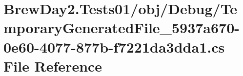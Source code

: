 \hypertarget{_brew_day2_8_tests01_2obj_2_debug_2_temporary_generated_file__5937a670-0e60-4077-877b-f7221da3dda1_8cs}{}\section{Brew\+Day2.\+Tests01/obj/\+Debug/\+Temporary\+Generated\+File\+\_\+5937a670-\/0e60-\/4077-\/877b-\/f7221da3dda1.cs File Reference}
\label{_brew_day2_8_tests01_2obj_2_debug_2_temporary_generated_file__5937a670-0e60-4077-877b-f7221da3dda1_8cs}
